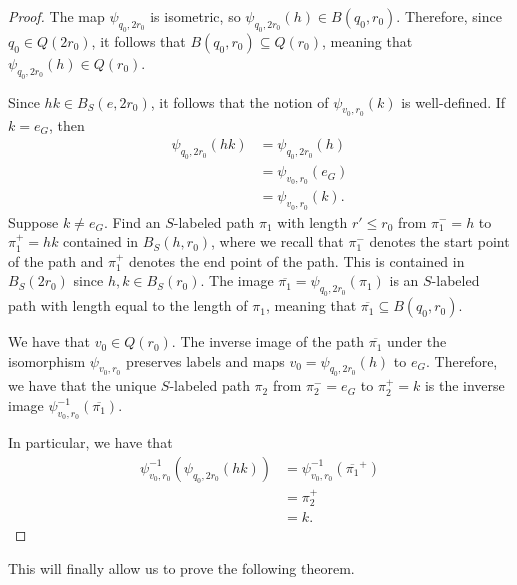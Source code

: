 \documentclass[10pt]{mypackage}
\begin{document}
\begin{proof}
  The map $\psi_{q_0,2r_0}$ is isometric, so $\psi_{q_0,2r_0}(h)\in B\left( q_0,r_0 \right)$. Therefore, since $q_0\in Q\left( 2r_0 \right)$, it follows that $B\left( q_0,r_0 \right)\subseteq Q\left( r_0 \right)$, meaning that $\psi_{q_0,2r_0}\left( h \right)\in Q\left( r_0 \right)$.

  Since $hk\in B_S\left( e,2r_0 \right)$, it follows that the notion of $\psi_{v_0,r_0}\left( k \right)$ is well-defined. If $k = e_G$, then
  \begin{align*}
    \psi_{q_0,2r_0}\left( hk \right) &= \psi_{q_0,2r_0}\left( h \right)\\
                                     &= \psi_{v_0,r_0}\left( e_G \right)\\
                                     &= \psi_{v_0,r_0}\left( k \right).
  \end{align*}
  Suppose $k\neq e_G$. Find an $S$-labeled path $\pi_1$ with length $r'\leq r_0$ from $\pi_1^{-} = h$ to $\pi_1^{+} = hk$ contained in $B_S\left( h,r_0 \right)$, where we recall that $\pi_1^{-}$ denotes the start point of the path and $\pi_1^{+}$ denotes the end point of the path. This is contained in $B_S\left( 2r_0 \right)$ since $h,k\in B_S\left( r_0 \right)$. The image $ \overline{\pi_1} = \psi_{q_0,2r_0}\left( \pi_1 \right)$ is an $S$-labeled path with length equal to the length of $\pi_1$, meaning that $ \overline{\pi_1}\subseteq B\left( q_0,r_0 \right) $.

  We have that $v_0\in Q\left( r_0 \right)$. The inverse image of the path $ \overline{\pi_1} $ under the isomorphism $\psi_{v_0,r_0}$ preserves labels and maps $v_0 = \psi_{q_0,2r_0}(h)$ to $e_G$. Therefore, we have that the unique $S$-labeled path $\pi_2$ from $\pi_2^{-} = e_G$ to $\pi_2^{+} = k$ is the inverse image $\psi_{v_0,r_0}^{-1}\left( \overline{\pi_1} \right)$.

  In particular, we have that
  \begin{align*}
    \psi_{v_0,r_0}^{-1} \left( \psi_{q_0,2r_0}\left( hk \right) \right) &= \psi_{v_0,r_0}^{-1}\left( \overline{\pi_1}^{+} \right)\\
                                                                        &= \pi_2^{+}\\
                                                                        &= k.
  \end{align*}
\end{proof}
This will finally allow us to prove the following theorem.
\end{document}
